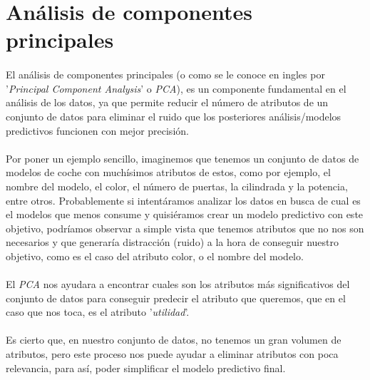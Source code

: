 \section{Análisis de componentes principales}
\label{section:pca}

\paragraph{}
El análisis de componentes principales (o como se le conoce en ingles por '\textit{Principal Component Analysis}' o \textit{PCA}), es un componente fundamental en el análisis de los datos, ya que permite reducir el número de atributos de un conjunto de datos para eliminar el ruido\cite{ref:noisy_data} que los posteriores análisis/modelos predictivos funcionen con mejor precisión\cite{ref:pca_def}.

\paragraph{}
Por poner un ejemplo sencillo, imaginemos que tenemos un conjunto de datos de modelos de coche con muchísimos atributos de estos, como por ejemplo, el nombre del modelo, el color, el número de puertas, la cilindrada y la potencia, entre otros. Probablemente si intentáramos analizar los datos en busca de cual es el modelos que menos consume y quisiéramos crear un modelo predictivo con este objetivo, podríamos observar a simple vista que tenemos atributos que no nos son necesarios y que generaría distracción (ruido\cite{ref:noisy_data}) a la hora de conseguir nuestro objetivo, como es el caso del atributo color, o el nombre del modelo.

\paragraph{}
El \textit{PCA} nos ayudara a encontrar cuales son los atributos más significativos del conjunto de datos para conseguir predecir el atributo que queremos\cite{ref:pca_def}, que en el caso que nos toca, es el atributo '\textit{utilidad}'.

\paragraph{}
Es cierto que, en nuestro conjunto de datos, no tenemos un gran volumen de atributos, pero este proceso nos puede ayudar a eliminar atributos con poca relevancia, para así, poder simplificar el modelo predictivo final.

